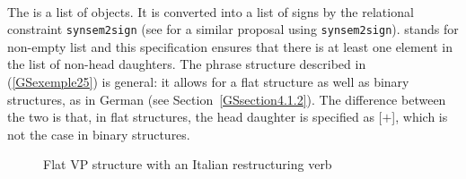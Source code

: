 \vbox{
\ea
\label{GSexemple25}
 \impl \\	
\z
}
\noindent
The \compsl is a list of  objects. It is converted into a list of signs by the
relational constraint \texttt{synsem2sign} (see \citealt[]{GSag2000a-u} for a similar
proposal using \texttt{synsem2sign}).  stands for non-empty list and this
specification ensures that there is at least one element in the list of non-head daughters. The
phrase structure described in (\ref{GSexemple25}) is general: it allows for a flat structure as well
as binary structures, as in German (see Section~\ref{GSsection4.1.2}). The difference between the
two is that, in flat structures, the head daughter is specified as \mbox{[\light{}$+$]}, which is
not the case in binary structures.


\begin{figure}
\caption{Flat VP structure with an Italian restructuring verb}
    \label{GSfigure4}
\end{figure}
%

